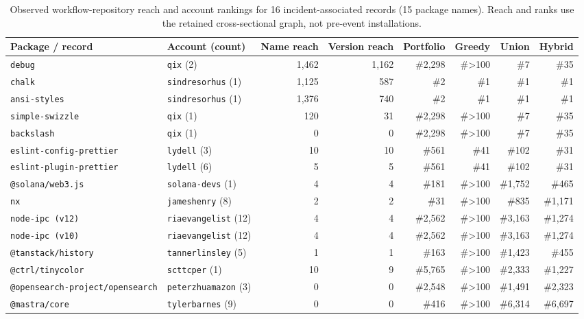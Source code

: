 \begin{table}[t]
\centering
\footnotesize
\caption{Observed workflow-repository reach and account rankings for 16 incident-associated records (15 package names). Reach and ranks use the retained cross-sectional graph, not pre-event installations.}
\label{tab:q1_incident_case_study}
\begin{tabularx}{\linewidth}{@{}Ylrrrrrr@{}}
\toprule
Package / record & Account (count) & Name reach & Version reach & Portfolio & Greedy & Union & Hybrid\\
\midrule
\texttt{debug} & \texttt{qix} (2) & 1,462 & 1,162 & \#2,298 & \#>100 & \#7 & \#35\\
\texttt{chalk} & \texttt{sindresorhus} (1) & 1,125 & 587 & \#2 & \#1 & \#1 & \#1\\
\texttt{ansi-styles} & \texttt{sindresorhus} (1) & 1,376 & 740 & \#2 & \#1 & \#1 & \#1\\
\texttt{simple-swizzle} & \texttt{qix} (1) & 120 & 31 & \#2,298 & \#>100 & \#7 & \#35\\
\texttt{backslash} & \texttt{qix} (1) & 0 & 0 & \#2,298 & \#>100 & \#7 & \#35\\
\texttt{eslint-config-prettier} & \texttt{lydell} (3) & 10 & 10 & \#561 & \#41 & \#102 & \#31\\
\texttt{eslint-plugin-prettier} & \texttt{lydell} (6) & 5 & 5 & \#561 & \#41 & \#102 & \#31\\
\texttt{@solana/web3.js} & \texttt{solana-devs} (1) & 4 & 4 & \#181 & \#>100 & \#1,752 & \#465\\
\texttt{nx} & \texttt{jameshenry} (8) & 2 & 2 & \#31 & \#>100 & \#835 & \#1,171\\
\texttt{node-ipc (v12)} & \texttt{riaevangelist} (12) & 4 & 4 & \#2,562 & \#>100 & \#3,163 & \#1,274\\
\texttt{node-ipc (v10)} & \texttt{riaevangelist} (12) & 4 & 4 & \#2,562 & \#>100 & \#3,163 & \#1,274\\
\texttt{@tanstack/history} & \texttt{tannerlinsley} (5) & 1 & 1 & \#163 & \#>100 & \#1,423 & \#455\\
\texttt{@ctrl/tinycolor} & \texttt{scttcper} (1) & 10 & 9 & \#5,765 & \#>100 & \#2,333 & \#1,227\\
\texttt{@opensearch-project/opensearch} & \texttt{peterzhuamazon} (3) & 0 & 0 & \#2,548 & \#>100 & \#1,491 & \#2,323\\
\texttt{@mastra/core} & \texttt{tylerbarnes} (9) & 0 & 0 & \#416 & \#>100 & \#6,314 & \#6,697\\

\end{tabularx}
\end{table}
